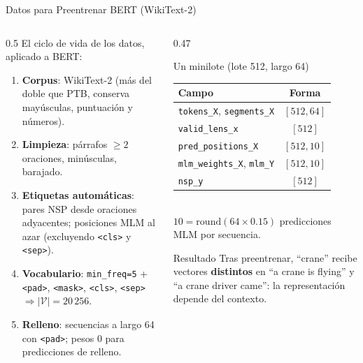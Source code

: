 \documentclass[aspectratio=169, 10pt]{beamer}
\newcommand{\V}{\mathcal{V}}
\newcommand{\tok}[1]{\texttt{#1}}
\begin{document}
\begin{frame}{Datos para Preentrenar BERT (WikiText-2)}

	\begin{columns}[T]
		\begin{column}{0.5\textwidth}
			\small
			El ciclo de vida de los datos, aplicado a BERT:
			\begin{enumerate}
				\item \textbf{Corpus}: WikiText-2 (m\'as del doble que PTB, conserva may\'usculas, puntuaci\'on y n\'umeros).
				\item \textbf{Limpieza}: p\'arrafos $\geq 2$ oraciones, min\'usculas, barajado.
				\item \textbf{Etiquetas autom\'aticas}: pares NSP desde oraciones adyacentes; posiciones MLM al azar (excluyendo \tok{<cls>} y \tok{<sep>}).
				\item \textbf{Vocabulario}: \texttt{min\_freq=5} + \tok{<pad>}, \tok{<mask>}, \tok{<cls>}, \tok{<sep>} $\Rightarrow |\V| = 20\,256$.
				\item \textbf{Relleno}: secuencias a largo 64 con \tok{<pad>}; pesos 0 para predicciones de relleno.
			\end{enumerate}
		\end{column}

		\begin{column}{0.47\textwidth}
			\begin{block}{Un minilote (lote 512, largo 64)}
				\centering
				\scriptsize
				\begin{tabular}{@{}lc@{}}
					\toprule
					Campo & Forma \\
					\midrule
					\texttt{tokens\_X}, \texttt{segments\_X} & $[512, 64]$ \\
					\texttt{valid\_lens\_x} & $[512]$ \\
					\texttt{pred\_positions\_X} & $[512, 10]$ \\
					\texttt{mlm\_weights\_X}, \texttt{mlm\_Y} & $[512, 10]$ \\
					\texttt{nsp\_y} & $[512]$ \\
					\bottomrule
				\end{tabular}
				\\[3pt]
				$10 = \mathrm{round}(64 \times 0.15)$ predicciones MLM por secuencia.
			\end{block}

			\begin{block}{Resultado}
				\small
				Tras preentrenar, ``crane'' recibe vectores \textbf{distintos} en ``a crane is flying'' y ``a crane driver came'': la representaci\'on depende del contexto.
			\end{block}
		\end{column}
	\end{columns}

\end{frame}
\end{document}
